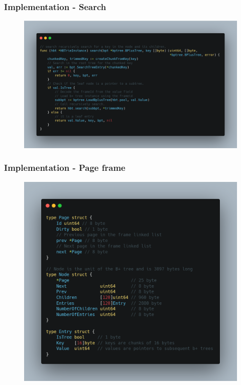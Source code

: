 \documentclass[aspectratio=169]{beamer}
\begin{document}
\begin{frame}[t]
	\frametitle{Implementation - Search}
	\begin{figure}[h!]
		\includegraphics[scale=0.18]{code_search}
	\end{figure}
	\centering
\end{frame}
\begin{frame}[t]
	\frametitle{Implementation - Page frame}
	\begin{figure}[h!]
		\includegraphics[scale=0.16]{code_page}
	\end{figure}
	\centering
\end{frame}
\end{document}
